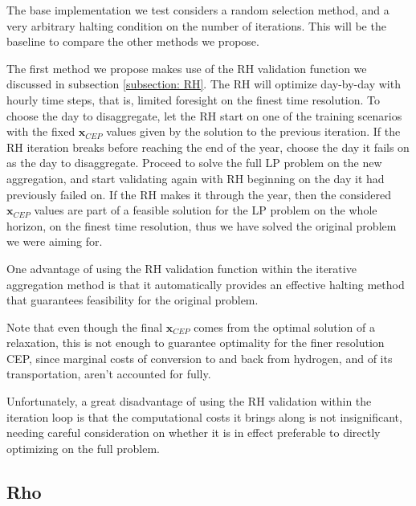 The base implementation we test considers a random selection method, and a very arbitrary halting condition on the number of iterations. 
This will be the baseline to compare the other methods we propose.


The first method we propose makes use of the RH validation function we discussed in subsection \ref{subsection: RH}. 
The RH will optimize day-by-day with hourly time steps, that is, limited foresight on the finest time resolution. 
To choose the day to disaggregate, let the RH start on one of the training scenarios with the fixed $\mathbf{x}_{CEP}$ values given by the solution to the previous iteration. 
If the RH iteration breaks before reaching the end of the year, choose the day it fails on as the day to disaggregate. 
Proceed to solve the full LP problem on the new aggregation, and start validating again with RH beginning on the day it had previously failed on. 
If the RH makes it through the year, then the considered $\mathbf{x}_{CEP}$ values are part of a feasible solution for the LP problem on the whole horizon, on the finest time resolution, thus we have solved the original problem we were aiming for.

One advantage of using the RH validation function within the iterative aggregation method is that it automatically provides an effective halting method that guarantees feasibility for the original problem.

Note that even though the final $\mathbf{x}_{CEP}$ comes from the optimal solution of a relaxation, this is not enough to guarantee optimality for the finer resolution CEP, since marginal costs of conversion to and back from hydrogen, and of its transportation, aren't accounted for fully. 

Unfortunately, a great disadvantage of using the RH validation within the iteration loop is that the computational costs it brings along is not insignificant, needing careful consideration on whether it is in effect preferable to directly optimizing on the full problem.

\subsection{Rho}\label{subsection: rho}  

